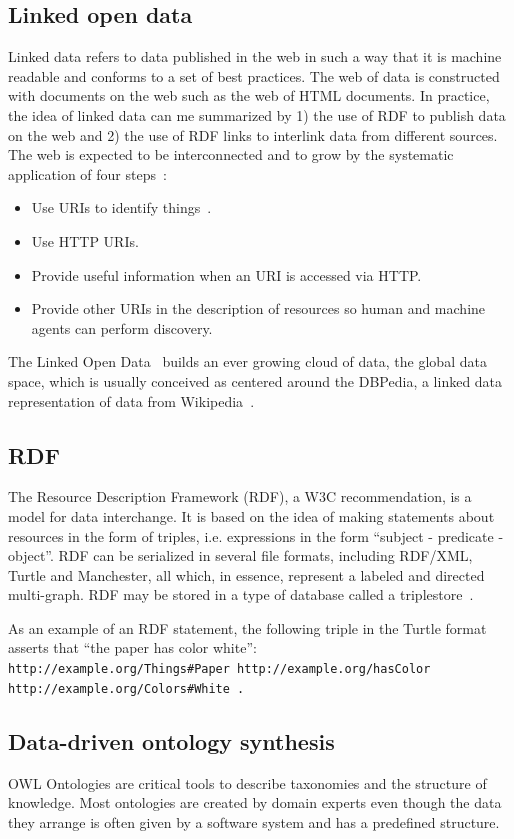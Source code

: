 \documentclass[review]{elsarticle}
\begin{document}
\subsection{Linked open data}
Linked data refers to data published in the web in such a way that it is
machine readable and conforms to a set of best practices.
The web of data is constructed with documents on the web 
such as the web of HTML documents.
In practice, the idea of linked data can me summarized
by 1) the use of RDF to publish data on the web and 2) the use of RDF
links to interlink data from different sources.
The web is expected to be interconnected and to grow by the systematic application of four
steps~\cite{lee1}:
\begin{itemize}
    \item Use URIs to identify things~\cite{uri}.
    \item Use HTTP URIs.
    \item Provide useful information when an URI is accessed via HTTP.
    \item Provide other URIs in the description of resources so human
        and machine agents can perform discovery.
\end{itemize}

The Linked Open Data~\cite{lod} builds an ever growing cloud of data,
the global data space, which is usually
conceived as centered around the DBPedia, a linked data representation
of data from Wikipedia~\cite{dbpedia0,dbpedia}.

\subsection{RDF}
The Resource Description Framework (RDF), a W3C
recommendation, is a model for data
interchange.
It is based on the idea of making statements about resources in the form
of triples, i.e. expressions in the form ``subject - predicate -
object''.
RDF can be serialized in several file formats, including RDF/XML,
Turtle and Manchester, all which, in essence, represent a labeled and
directed multi-graph.
RDF may be stored in a type of database called a triplestore~\cite{rdf}.

As an example of an RDF statement, the following triple in the Turtle
format asserts that ``the paper has color white'':\\
\texttt{http://example.org/Things\#Paper http://example.org/hasColor\\
http://example.org/Colors\#White .}

\subsection{Data-driven ontology synthesis}
OWL Ontologies are critical tools to describe taxonomies and the
structure of knowledge.
Most ontologies are created by domain experts even though the data they
arrange is often given by a software system and has a predefined
structure.  
\end{document}
